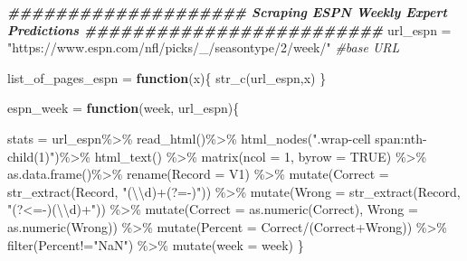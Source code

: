 \documentclass[
]{article}
\newenvironment{Shaded}{\begin{snugshade}}{\end{snugshade}}
\newcommand{\AttributeTok}[1]{\textcolor[rgb]{0.77,0.63,0.00}{#1}}
\newcommand{\CommentTok}[1]{\textcolor[rgb]{0.56,0.35,0.01}{\textit{#1}}}
\newcommand{\ConstantTok}[1]{\textcolor[rgb]{0.00,0.00,0.00}{#1}}
\newcommand{\ControlFlowTok}[1]{\textcolor[rgb]{0.13,0.29,0.53}{\textbf{#1}}}
\newcommand{\DecValTok}[1]{\textcolor[rgb]{0.00,0.00,0.81}{#1}}
\newcommand{\DocumentationTok}[1]{\textcolor[rgb]{0.56,0.35,0.01}{\textbf{\textit{#1}}}}
\newcommand{\FunctionTok}[1]{\textcolor[rgb]{0.00,0.00,0.00}{#1}}
\newcommand{\NormalTok}[1]{#1}
\newcommand{\OtherTok}[1]{\textcolor[rgb]{0.56,0.35,0.01}{#1}}
\newcommand{\SpecialCharTok}[1]{\textcolor[rgb]{0.00,0.00,0.00}{#1}}
\newcommand{\StringTok}[1]{\textcolor[rgb]{0.31,0.60,0.02}{#1}}
\begin{document}
\begin{Shaded}
\begin{Highlighting}[]
\DocumentationTok{\#\#\#\#\#\#\#\#\#\#\#\#\#\#\#\#\#\#\#\# Scraping ESPN Weekly Expert Predictions \#\#\#\#\#\#\#\#\#\#\#\#\#\#\#\#\#\#\#\#\#\#\#\#\#}
\NormalTok{url\_espn }\OtherTok{=} \StringTok{"https://www.espn.com/nfl/picks/\_/seasontype/2/week/"}  \CommentTok{\#base URL}

\NormalTok{list\_of\_pages\_espn }\OtherTok{=} \ControlFlowTok{function}\NormalTok{(x)\{}
  \FunctionTok{str\_c}\NormalTok{(url\_espn,x)}
\NormalTok{\}}

\NormalTok{espn\_week }\OtherTok{=} \ControlFlowTok{function}\NormalTok{(week, url\_espn)\{}
  
\NormalTok{  stats }\OtherTok{=}\NormalTok{ url\_espn}\SpecialCharTok{\%\textgreater{}\%}
    \FunctionTok{read\_html}\NormalTok{()}\SpecialCharTok{\%\textgreater{}\%}
    \FunctionTok{html\_nodes}\NormalTok{(}\StringTok{".wrap{-}cell span:nth{-}child(1)"}\NormalTok{)}\SpecialCharTok{\%\textgreater{}\%}
    \FunctionTok{html\_text}\NormalTok{() }\SpecialCharTok{\%\textgreater{}\%} 
    \FunctionTok{matrix}\NormalTok{(}\AttributeTok{ncol =} \DecValTok{1}\NormalTok{, }\AttributeTok{byrow =} \ConstantTok{TRUE}\NormalTok{) }\SpecialCharTok{\%\textgreater{}\%}
    \FunctionTok{as.data.frame}\NormalTok{()}\SpecialCharTok{\%\textgreater{}\%}
    \FunctionTok{rename}\NormalTok{(}\StringTok{\textasciigrave{}}\AttributeTok{Record}\StringTok{\textasciigrave{}} \OtherTok{=}\NormalTok{ V1) }\SpecialCharTok{\%\textgreater{}\%} 
    \FunctionTok{mutate}\NormalTok{(}\AttributeTok{Correct =} \FunctionTok{str\_extract}\NormalTok{(Record, }\StringTok{"(}\SpecialCharTok{\textbackslash{}\textbackslash{}}\StringTok{d)+(?={-})"}\NormalTok{)) }\SpecialCharTok{\%\textgreater{}\%} 
    \FunctionTok{mutate}\NormalTok{(}\AttributeTok{Wrong =} \FunctionTok{str\_extract}\NormalTok{(Record, }\StringTok{"(?\textless{}={-})(}\SpecialCharTok{\textbackslash{}\textbackslash{}}\StringTok{d)+"}\NormalTok{)) }\SpecialCharTok{\%\textgreater{}\%} 
    \FunctionTok{mutate}\NormalTok{(}\AttributeTok{Correct =} \FunctionTok{as.numeric}\NormalTok{(Correct), }\AttributeTok{Wrong =} \FunctionTok{as.numeric}\NormalTok{(Wrong)) }\SpecialCharTok{\%\textgreater{}\%} 
    \FunctionTok{mutate}\NormalTok{(}\AttributeTok{Percent =}\NormalTok{ Correct}\SpecialCharTok{/}\NormalTok{(Correct}\SpecialCharTok{+}\NormalTok{Wrong)) }\SpecialCharTok{\%\textgreater{}\%} 
    \FunctionTok{filter}\NormalTok{(Percent}\SpecialCharTok{!=}\StringTok{"NaN"}\NormalTok{) }\SpecialCharTok{\%\textgreater{}\%} 
    \FunctionTok{mutate}\NormalTok{(}\AttributeTok{week =}\NormalTok{ week)}
\NormalTok{\}}


\end{Highlighting}
\end{Shaded}
\end{document}
